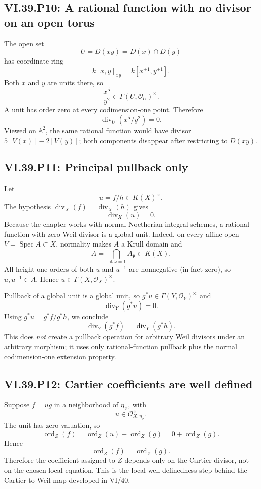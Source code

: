 \subsection*{VI.39.P10: A rational function with no divisor on an open torus}
\begin{solution}
The open set
\[
 U=D(xy)=D(x)\cap D(y)
\]
has coordinate ring
\[
 k[x,y]_{xy}=k[x^{\pm1},y^{\pm1}].
\]
Both \(x\) and \(y\) are units there, so
\[
 \frac{x^5}{y^2}\in\Gamma(U,\mathcal O_U)^\times.
\]
A unit has order zero at every codimension-one point.  Therefore
\[
 \boxed{\operatorname{div}_U(x^5/y^2)=0.}
\]
Viewed on \(\mathbb A^2\), the same rational function would have divisor \(5[V(x)]-2[V(y)]\); both components disappear after restricting to \(D(xy)\).
\end{solution}

\subsection*{VI.39.P11: Principal pullback only}
\begin{solution}
Let
\[
 u=f/h\in K(X)^\times.
\]
The hypothesis \(\operatorname{div}_X(f)=\operatorname{div}_X(h)\) gives
\[
 \operatorname{div}_X(u)=0.
\]
Because the chapter works with normal Noetherian integral schemes, a rational function with zero Weil divisor is a global unit.  Indeed, on every affine open \(V=\operatorname{Spec}A\subset X\), normality makes \(A\) a Krull domain and
\[
 A=\bigcap_{\operatorname{ht}\mathfrak p=1}A_{\mathfrak p}
 \subset K(X).
\]
All height-one orders of both \(u\) and \(u^{-1}\) are nonnegative (in fact zero), so \(u,u^{-1}\in A\).  Hence \(u\in\Gamma(X,\mathcal O_X)^\times\).

Pullback of a global unit is a global unit, so \(g^*u\in\Gamma(Y,\mathcal O_Y)^\times\) and
\[
 \operatorname{div}_Y(g^*u)=0.
\]
Using \(g^*u=g^*f/g^*h\), we conclude
\[
 \boxed{\operatorname{div}_Y(g^*f)=\operatorname{div}_Y(g^*h).}
\]
This does \emph{not} create a pullback operation for arbitrary Weil divisors under an arbitrary morphism; it uses only rational-function pullback plus the normal codimension-one extension property.
\end{solution}

\subsection*{VI.39.P12: Cartier coefficients are well defined}
\begin{solution}
Suppose \(f=ug\) in a neighborhood of \(\eta_Z\), with
\[
 u\in\mathcal O_{X,\eta_Z}^{\times}.
\]
The unit has zero valuation, so
\[
 \operatorname{ord}_Z(f)
 =\operatorname{ord}_Z(u)+\operatorname{ord}_Z(g)
 =0+\operatorname{ord}_Z(g).
\]
Hence
\[
 \boxed{\operatorname{ord}_Z(f)=\operatorname{ord}_Z(g).}
\]
Therefore the coefficient assigned to \(Z\) depends only on the Cartier divisor, not on the chosen local equation.  This is the local well-definedness step behind the Cartier-to-Weil map developed in VI/40.
\end{solution}
